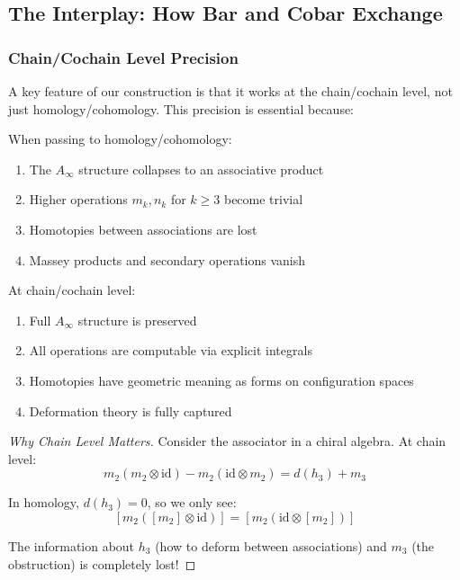 
\subsection{The Interplay: How Bar and Cobar Exchange}

\subsubsection{Chain/Cochain Level Precision}

A key feature of our construction is that it works at the chain/cochain level, not just homology/cohomology. This precision is essential because:

\begin{theorem}
When passing to homology/cohomology:
\begin{enumerate}
\item The $A_\infty$ structure collapses to an associative product
\item Higher operations $m_k, n_k$ for $k \geq 3$ become trivial
\item Homotopies between associations are lost
\item Massey products and secondary operations vanish
\end{enumerate}

At chain/cochain level:
\begin{enumerate}
\item Full $A_\infty$ structure is preserved
\item All operations are computable via explicit integrals
\item Homotopies have geometric meaning as forms on configuration spaces
\item Deformation theory is fully captured
\end{enumerate}
\end{theorem}

\begin{proof}[Why Chain Level Matters]
Consider the associator in a chiral algebra. At chain level:
$$m_2(m_2 \otimes \text{id}) - m_2(\text{id} \otimes m_2) = d(h_3) + m_3$$

In homology, $d(h_3) = 0$, so we only see:
$$[m_2([m_2] \otimes \text{id})] = [m_2(\text{id} \otimes [m_2])]$$

The information about $h_3$ (how to deform between associations) and $m_3$ (the obstruction) is completely lost!
\end{proof}

